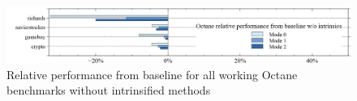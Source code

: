 \begin{figure}[ht]
  \begin{center}
    \centering
    \includegraphics[width=1.0\textwidth]{figures/octane_noi_variation.png}
    \caption{Relative performance from baseline for all working Octane benchmarks without intrinsified methods}
    \label{f:octane_noi_variation}
  \end{center}
\end{figure}
